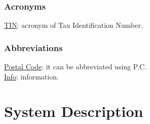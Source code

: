 \documentclass[12pt]{article}
\begin{document}
\subsubsection{Acronyms}
\underline{TIN}: acronym of Tax Identification Number.\\
\subsubsection{Abbreviations}
\underline{Postal Code}: it can be abbreviated using P.C.\\
\underline{Info}: information.\\

\section{System Description}
\end{document}
